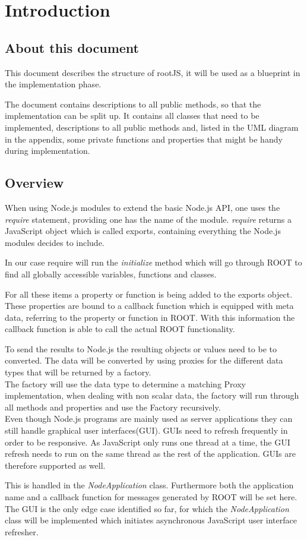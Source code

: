 \chapter{Introduction}
\section{About this document}
This document describes the structure of rootJS, it will be used as a blueprint in the implementation phase.

The document contains descriptions to all public methods, so that the implementation can be split up. It contains all classes that need to be implemented, descriptions to all public methods and, listed in the UML diagram in the appendix, some private functions and properties that might be handy during implementation.

\section{Overview}
When using Node.js modules to extend the basic Node.js API, one uses the \textit{require} statement, providing one has the name of the module.
\textit{require} returns a JavaScript object which is called exports, containing everything the Node.js modules decides to include.

In our case require will run the \textit{initialize} method which will go through ROOT to find all globally accessible variables, functions and classes.

For all these items a property or function is being added to the exports object.
These properties are bound to a callback function which is equipped with meta data, referring to the property or function in ROOT.
With this information the callback function is able to call the actual ROOT functionality.

To send the results to Node.js the resulting objects or values need to be to converted. 
The data will be converted by using proxies for the different data types that will be returned by a factory.\\

The factory will use the data type to determine a matching Proxy implementation, when dealing with non scalar data, the factory will run through all methods and properties and use the Factory recursively.\\

Even though Node.js programs are mainly used as server applications they can still handle graphical user interfaces(GUI).
GUIs need to refresh frequently in order to be responsive. As JavaScript only runs one thread at a time, the GUI refresh needs to run on the same thread as the rest of the application. GUIs are therefore supported as well. 

This is handled in the \textit{NodeApplication} class. Furthermore both the application name and a callback function for messages generated by ROOT will be set here. The GUI is the only edge case identified so far, for which the \textit{NodeApplication} class will be implemented which initiates asynchronous JavaScript user interface refresher. 
